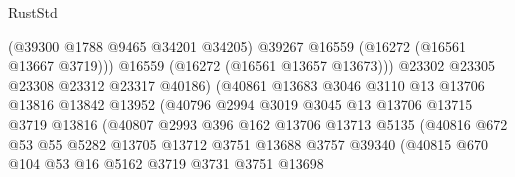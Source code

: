 \begin{lexlean}{RustStd}
\begin{coremodule}
                                      (@39300 @1788 @9465 @34201 @34205)
                                      @39267
                                      @16559
                                      (@16272 (@16561 @13667 @3719)))
                                    @16559
                                    (@16272 (@16561 @13657 @13673)))
                                  @23302
                                  @23305
                                  @23308
                                  @23312
                                  @23317
                                  @40186)
                                (@40861
                                  @13683
                                  @3046
                                  @3110
                                  @13
                                  @13706
                                  @13816
                                  @13842
                                  @13952
                                  (@40796
                                    @2994
                                    @3019
                                    @3045
                                    @13
                                    @13706
                                    @13715
                                    @3719
                                    @13816
                                    (@40807
                                      @2993
                                      @396
                                      @162
                                      @13706
                                      @13713
                                      @5135
                                      (@40816
                                        @672
                                        @53
                                        @55
                                        @5282
                                        @13705
                                        @13712
                                        @3751
                                        @13688
                                        @3757
                                        @39340
                                        (@40815
                                          @670
                                          @104
                                          @53
                                          @16
                                          @5162
                                          @3719
                                          @3731
                                          @3751
                                          @13698

\end{coremodule}
\end{lexlean}
